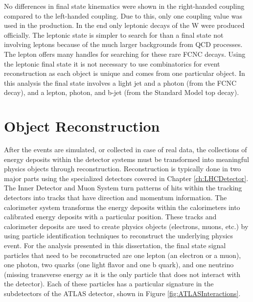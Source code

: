 No differences in final state kinematics were shown in the right-handed coupling compared to the left-handed coupling.  Due to this, only one coupling value was used in the production.  In the end only leptonic decays of the W were produced officially.  The leptonic state is simpler to search for than a final state not involving leptons because of the much larger backgrounds from QCD processes.  The lepton offers many handles for searching for these rare FCNC decays.  Using the leptonic final state it is not necessary to use combinatorics for event reconstruction as each object is unique and comes from one particular object.  In this analysis the final state involves a light jet and a photon (from the FCNC decay), and a lepton, photon, and b-jet (from the Standard Model top decay).




\section{Object Reconstruction}

After the events are simulated, or collected in case of real data, the collections of energy deposits within the detector systems must be transformed into meaningful physics objects through reconstruction.  Reconstruction is typically done in two major parts using the specialized detectors covered in Chapter \ref{ch:LHCDetector}.  The Inner Detector and Muon System turn patterns of hits within the tracking detectors into tracks that have direction and momentum information.  The calorimeter system transforms the energy deposits within the calorimeters into calibrated energy deposits with a particular position.  These tracks and calorimeter deposits are used to create physics objects (electrons, muons, etc.) by using particle identification techniques to reconstruct the underlying physics event.  For the analysis presented in this dissertation, the final state signal particles that need to be reconstructed are one lepton (an electron or a muon), one photon, two quarks (one light flavor and one b quark), and one neutrino (missing transverse energy as it is the only particle that does not interact with the detector).  Each of these particles has a particular signature in the subdetectors of the ATLAS detector, shown in Figure \ref{fig:ATLASInteractions}.

